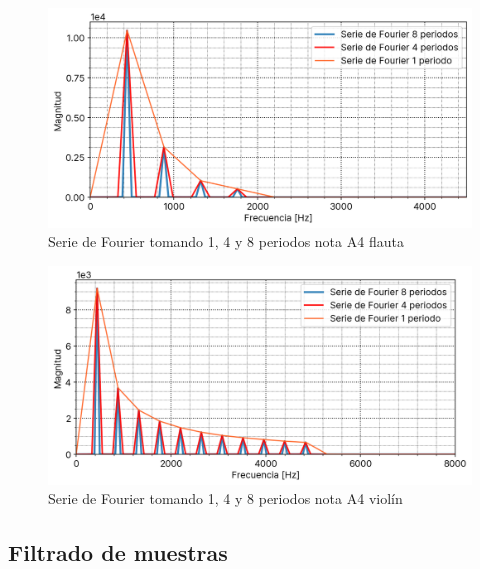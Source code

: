 \documentclass[12pt]{article}
\begin{document}
\begin{figure}[H]
\centering
\includegraphics{plot/a4_flauta_fseries_comparison.png}
\caption{Serie de Fourier tomando 1, 4 y 8 periodos nota A4 flauta}
\label{a4_flauta_fseries_comparison}
\end{figure}

\begin{figure}[H]
\centering
\includegraphics{plot/a4_violin_fseries_comparison.png}
\caption{Serie de Fourier tomando 1, 4 y 8 periodos nota A4 violín}
\label{a4_violin_fseries_comparison}
\end{figure}

\hypertarget{filtrado-de-muestras}{%
\subsection{Filtrado de muestras}\label{filtrado-de-muestras}}
\end{document}
